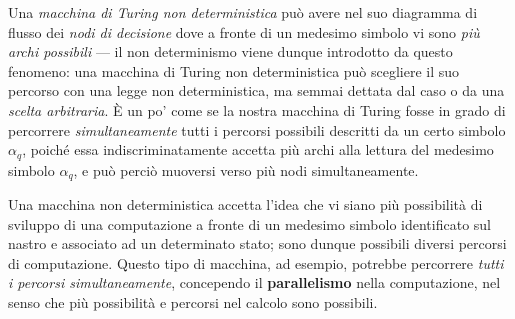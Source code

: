 \documentclass[10pt]{\classname}
\theoremstyle{definition}
\theoremstyle{definition}
\begin{document}
Una \emph{macchina di Turing non deterministica} può avere nel suo diagramma di
flusso dei \emph{nodi di decisione} dove a fronte di un medesimo simbolo vi
sono \emph{più archi possibili} --- il non determinismo viene dunque introdotto
da questo fenomeno: una macchina di Turing non deterministica può scegliere il
suo percorso con una legge non deterministica, ma semmai dettata dal caso o da
una \emph{scelta arbitraria}. È un po' come se la nostra macchina di Turing
fosse in grado di percorrere \emph{simultaneamente} tutti i percorsi possibili
descritti da un certo simbolo $\alpha_q$, poiché essa indiscriminatamente
accetta più archi alla lettura del medesimo simbolo $\alpha_q$, e può perciò
muoversi verso più nodi simultaneamente.

Una macchina non deterministica accetta l'idea che vi siano più possibilità di
sviluppo di una computazione a fronte di un medesimo simbolo identificato sul
nastro e associato ad un determinato stato; sono dunque possibili diversi
percorsi di computazione. Questo tipo di macchina, ad esempio, potrebbe
percorrere \emph{tutti i percorsi simultaneamente}, concependo il
\textbf{parallelismo} nella computazione, nel senso che più possibilità e
percorsi nel calcolo sono possibili. 
\end{document}
